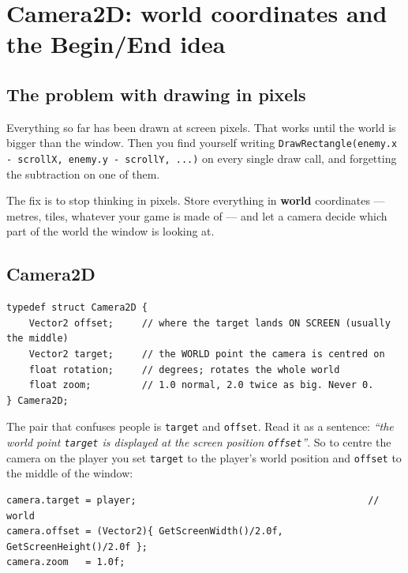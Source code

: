 \chapter{Camera2D: world coordinates and the Begin/End idea}

\section{The problem with drawing in pixels}

Everything so far has been drawn at screen pixels. That works until the world is
bigger than the window. Then you find yourself writing
\lstinline|DrawRectangle(enemy.x - scrollX, enemy.y - scrollY, ...)| on every
single draw call, and forgetting the subtraction on one of them.

The fix is to stop thinking in pixels. Store everything in \textbf{world}
coordinates --- metres, tiles, whatever your game is made of --- and let a camera
decide which part of the world the window is looking at.

\section{Camera2D}

\begin{lstlisting}
typedef struct Camera2D {
    Vector2 offset;     // where the target lands ON SCREEN (usually the middle)
    Vector2 target;     // the WORLD point the camera is centred on
    float rotation;     // degrees; rotates the whole world
    float zoom;         // 1.0 normal, 2.0 twice as big. Never 0.
} Camera2D;
\end{lstlisting}

The pair that confuses people is \lstinline|target| and \lstinline|offset|. Read
it as a sentence: \emph{``the world point \lstinline|target| is displayed at the
screen position \lstinline|offset|''}. So to centre the camera on the player you
set \lstinline|target| to the player's world position and \lstinline|offset| to
the middle of the window:

\begin{lstlisting}
camera.target = player;                                         // world
camera.offset = (Vector2){ GetScreenWidth()/2.0f, GetScreenHeight()/2.0f };
camera.zoom   = 1.0f;
\end{lstlisting}


